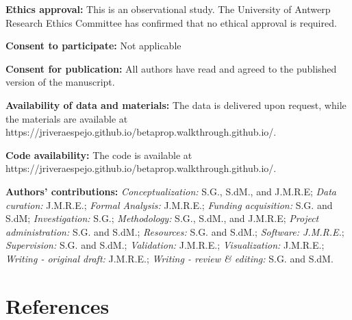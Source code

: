 \documentclass[
  authoryear,
  preprint,
  1p]{elsarticle}
\begin{document}
\textbf{Ethics approval:} This is an observational study. The University
of Antwerp Research Ethics Committee has confirmed that no ethical
approval is required.

\textbf{Consent to participate:} Not applicable

\textbf{Consent for publication:} All authors have read and agreed to
the published version of the manuscript.

\textbf{Availability of data and materials:} The data is delivered upon
request, while the materials are available at
https://jriveraespejo.github.io/betaprop.walkthrough.github.io/.

\textbf{Code availability:} The code is available at
https://jriveraespejo.github.io/betaprop.walkthrough.github.io/.

\textbf{Authors' contributions:} \emph{Conceptualization:} S.G., S.dM.,
and J.M.R.E; \emph{Data curation:} J.M.R.E.; \emph{Formal Analysis:}
J.M.R.E.; \emph{Funding acquisition:} S.G. and S.dM;
\emph{Investigation:} S.G.; \emph{Methodology:} S.G., S.dM., and
J.M.R.E; \emph{Project administration:} S.G. and S.dM.;
\emph{Resources:} S.G. and S.dM.; \emph{Software: J.M.R.E.};
\emph{Supervision:} S.G. and S.dM.; \emph{Validation:} J.M.R.E.;
\emph{Visualization:} J.M.R.E.; \emph{Writing - original draft:}
J.M.R.E.; \emph{Writing - review \& editing:} S.G. and S.dM.

\newpage{}

\section*{References}\label{references}

\renewcommand{\bibsection}{}

\end{document}
